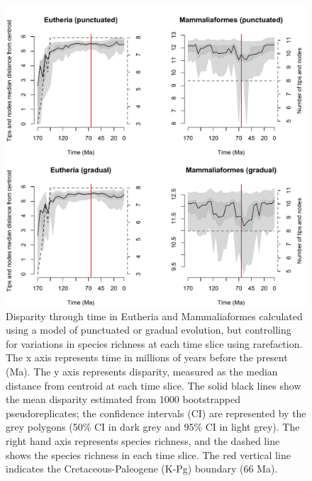 \documentclass[12pt,letterpaper]{article}
\begin{document}
\begin{figure}[!htbp]
\centering
    \includegraphics[keepaspectratio=true]{Figures/Main_results_rarefied.pdf}
\caption{Disparity through time in Eutheria and Mammaliaformes calculated using a model of punctuated or gradual evolution, but controlling for variations in species richness at each time slice using rarefaction. The x axis represents time in millions of years before the present (Ma). The y axis represents disparity, measured as the median distance from centroid at each time slice. %
 The solid black lines show the mean disparity estimated from 1000 bootstrapped pseudoreplicates; the confidence intervals (CI) are represented by the grey polygons (50\% CI in dark grey and 95\% CI in light grey). The right hand axis represents species richness, and the dashed line shows the species richness in each time slice. The red vertical line indicates the Cretaceous-Paleogene (K-Pg) boundary (66 Ma).}
\label{fig:Fig_Rar_results}
\end{figure}
\end{document}
